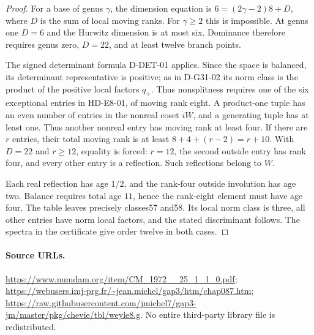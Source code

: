\begin{proof}
For a base of genus $\gamma$, the dimension equation is
$6=(2\gamma-2)8+D$, where $D$ is the sum of local moving ranks.
For $\gamma\ge2$ this is impossible. At genus one $D=6$ and
the Hurwitz dimension is at most six. Dominance therefore requires
genus zero, $D=22$, and at least twelve branch points.

The signed determinant formula D-DET-01 applies. Since the space
is balanced, its determinant representative is positive; as in
D-G31-02 its norm class is the product of the positive local factors
$q_+$. Thus nonsplitness requires one of the six exceptional entries
in HD-E8-01, of moving rank eight. A product-one tuple has an even
number of entries in the nonreal coset $iW$, and a generating tuple
has at least one. Thus another nonreal entry has moving rank at
least four. If there are $r$ entries, their total moving rank is at
least $8+4+(r-2)=r+10$. With $D=22$ and $r\ge12$, equality
is forced: $r=12$, the second outside entry has rank four, and
every other entry is a reflection. Such reflections belong to $W$.

Each real reflection has age $1/2$, and the rank-four outside
involution has age two. Balance requires total age $11$, hence the
rank-eight element must have age four. The table leaves precisely
classes57 and58. Its local norm class is three, all other entries
have norm local factors, and the stated discriminant follows.
The spectra in the certificate give order twelve in both cases.
\end{proof}

\paragraph{Source URLs.}
\url{https://www.numdam.org/item/CM_1972__25_1_1_0.pdf};
\url{https://webusers.imj-prg.fr/~jean.michel/gap3/htm/chap087.htm};
\url{https://raw.githubusercontent.com/jmichel7/gap3-jm/master/pkg/chevie/tbl/weyle8.g}.
No entire third-party library file is redistributed.
